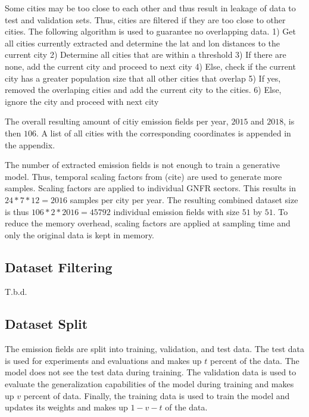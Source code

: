 Some cities may be too close to each other and thus result in leakage of data to test and validation sets.
Thus, cities are filtered if they are too close to other cities.
The following algorithm is used to guarantee no overlapping data.
1) Get all cities currently extracted and determine the lat and lon distances to the current city
2) Determine all cities that are within a threshold
3) If there are none, add the current city and proceed to next city
4) Else, check if the current city has a greater population size that all other cities that overlap
5) If yes, removed the overlaping cities and add the current city to the cities.
6) Else, ignore the city and proceed with next city

The overall resulting amount of citiy emission fields per year, $2015$ and $2018$, is then $106$.
A list of all cities with the corresponding coordinates is appended in the appendix.

The number of extracted emission fields is not enough to train a generative model.
Thus, temporal scaling factors from (cite) are used to generate more samples.
Scaling factors are applied to individual GNFR sectors.
This results in $24 * 7 * 12 = 2016$ samples per city per year.
The resulting combined dataset size is thus $106 * 2 * 2016 = 45792$ individual emission fields with size $51$ by $51$.
To reduce the memory overhead, scaling factors are applied at sampling time and only the original data is kept in memory.

\subsection{Dataset Filtering}
T.b.d.

\subsection{Dataset Split}
The emission fields are split into training, validation, and test data.
The test data is used for experiments and evaluations and makes up $t$ percent of the data.
The model does not see the test data during training.
The validation data is used to evaluate the generalization capabilities of the model during training and makes up $v$ percent of data.
Finally, the training data is used to train the model and updates its weights and makes up $1 - v - t$ of the data.

